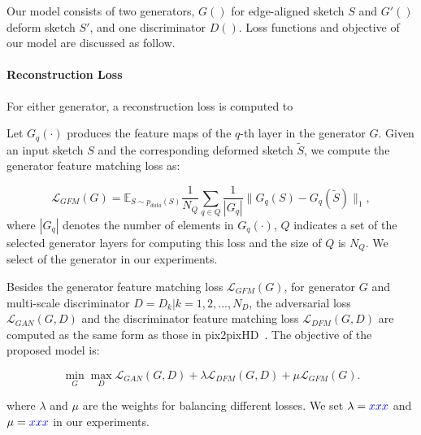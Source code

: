 
Our model consists of two generators, $G()$ for edge-aligned sketch $S$ and $G'()$ deform sketch $S'$, and one discriminator $D()$. Loss functions and objective of our model are discussed as follow.

\paragraph{Reconstruction Loss}
For either generator, a reconstruction loss is computed to


Let $G_q(\cdot)$ produces the feature maps of the $q$-th layer in the generator $G$.
%
Given an input sketch $S$ and the corresponding deformed sketch $\tilde{S}$, we compute the generator feature matching loss as:

\begin{equation}
	\label{eqn:loss_GFM}
	\mathcal{L}_{GFM}(G)=\mathbb{E}_{S\sim p_{data}(S)} \frac{1}{N_Q} \sum_{q\in Q}  \frac{1}{|G_q|} \|G_q(S)-G_q(\tilde{S}) \|_1,
\end{equation}
%
where $|G_q|$ denotes the number of elements in $G_q(\cdot)$, $Q$ indicates a set of the selected generator layers for computing this loss and the size of $Q$ is $N_Q$. 
We select  of the generator in our experiments.

Besides the generator feature matching loss $\mathcal{L}_{GFM}(G)$, for generator $G$ and multi-scale discriminator $D={D_k | k=1,2,...,N_D}$, the adversarial loss $\mathcal{L}_{GAN}(G, D)$ and the discriminator feature matching loss $\mathcal{L}_{DFM}(G, D)$ are computed as the same form as those in pix2pixHD~\cite{pix2pixHD}. 
%
The objective of the proposed model is:

\begin{equation}
	\label{eqn:new_minmax_game}
	\min_G \max_{D} \mathcal{L}_{GAN}(G, D)+\lambda \mathcal{L}_{DFM}(G, D) +\mu \mathcal{L}_{GFM}(G).
\end{equation}

where $\lambda$ and $\mu$ are the weights for balancing different losses. We set $\lambda=\textcolor{blue}{xxx}$ and $\mu=\textcolor{blue}{xxx}$ in our experiments.
